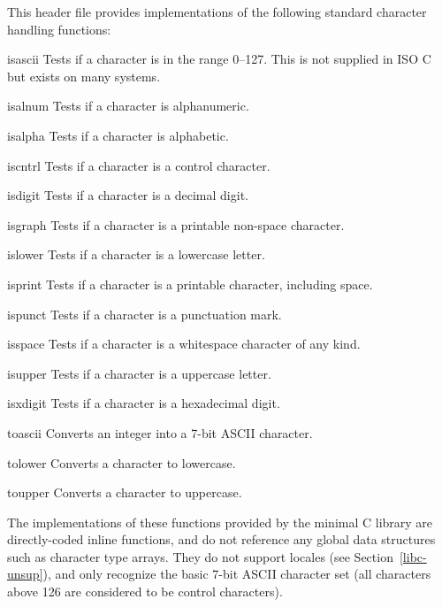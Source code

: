 \label{ctype-h}
\begin{apidesc}
	This header file provides implementations
	of the following standard character handling functions:
	\begin{icsymlist}
	\item[isascii]
		Tests if a character is in the range 0--127.
		This is not supplied in ISO C but exists on many systems.
	\item[isalnum]
		Tests if a character is alphanumeric.
	\item[isalpha]
		Tests if a character is alphabetic.
	\item[iscntrl]
		Tests if a character is a control character.
	\item[isdigit]
		Tests if a character is a decimal digit.
	\item[isgraph]
		Tests if a character is a printable non-space character.
	\item[islower]
		Tests if a character is a lowercase letter.
	\item[isprint]
		Tests if a character is a printable character, including space.
	\item[ispunct]
		Tests if a character is a punctuation mark.
	\item[isspace]
		Tests if a character is a whitespace character of any kind.
	\item[isupper]
		Tests if a character is a uppercase letter.
	\item[isxdigit]
		Tests if a character is a hexadecimal digit.
	\item[toascii]
		Converts an integer into a 7-bit ASCII character.
	\item[tolower]
		Converts a character to lowercase.
	\item[toupper]
		Converts a character to uppercase.
	\end{icsymlist}
	The implementations of these functions
	provided by the minimal C library
	are directly-coded inline functions,
	and do not reference any global data structures
	such as character type arrays.
	They do not support locales (see Section~\ref{libc-unsup}),
	and only recognize the basic 7-bit ASCII character set
	(all characters above 126 are considered to be control characters).
\end{apidesc}


